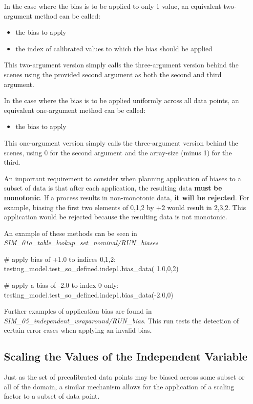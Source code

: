 \documentclass[11pt,fleqn]{report}
\begin{document}
In the case where the bias is to be applied to only 1 value, an equivalent
two-argument method can be called:
\begin{itemize}
\item the bias to apply
\item the index of calibrated values to which the bias should be applied
\end{itemize}
This two-argument version simply calls the three-argument version behind the
scenes using the provided second argument as both the second and third argument.

In the case where the bias is to be applied uniformly across all data points, an
equivalent one-argument method can be called:
\begin{itemize}
\item the bias to apply
\end{itemize}
This one-argument version simply calls the three-argument version behind the
scenes, using 0 for the second argument and the array-size (minus 1) for the
third.


An important requirement to consider when planning application of biases to a
subset of data is that after each application, the resulting data
\textbf{must be monotonic}.  If a process results in non-monotonic data,
\textbf{it will be rejected}.  For example, biasing the first two elements of
{0,1,2} by +2 would result in {2,3,2}.  This application would be rejected
because the resulting data is not monotonic.

An example of these methods can be seen in
\textit{SIM\_01a\_table\_lookup\_set\_nominal/RUN\_biases}
\begin{code}
# apply bias of +1.0 to indices 0,1,2:
testing_model.test_so_defined.indep1.bias_data( 1.0,0,2)

# apply a bias of -2.0 to index 0 only:
testing_model.test_so_defined.indep1.bias_data(-2.0,0)
\end{code}

Further examples of application bias are found in
\textit{SIM\_05\_independent\_wraparound/RUN\_bias}.  This run tests the
detection of certain error cases when applying an invalid bias.


\subsection {Scaling the Values of the Independent Variable}

Just as the set of precalibrated data points may be biased across some
subset or all of the domain, a similar mechanism allows for the application
of a scaling factor to a subset of data point.
\end{document}
